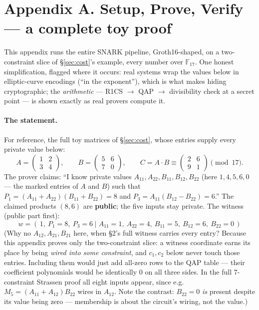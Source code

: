 \documentclass[10pt]{article}
\begin{document}
\section*{Appendix A. Setup, Prove, Verify --- a complete toy
proof}\label{app:tutorial}

This appendix runs the entire SNARK pipeline, Groth16-shaped, on a
two-constraint slice of \S\ref{sec:cost}'s example, every number over
$\mathbb{F}_{17}$. One honest simplification, flagged where it
occurs: real systems wrap the values below in elliptic-curve
encodings (``in the exponent''), which is what makes hiding
cryptographic; the \emph{arithmetic} --- R1CS $\to$ QAP $\to$
divisibility check at a secret point --- is shown exactly as real
provers compute it.

\paragraph{The statement.} For reference, the full toy matrices of
\S\ref{sec:cost}, whose entries supply every private value below:
\[
A = \begin{pmatrix} 1 & 2\\ 3 & 4 \end{pmatrix}, \qquad
B = \begin{pmatrix} 5 & 6\\ 7 & 0 \end{pmatrix}, \qquad
C = A\cdot B \equiv \begin{pmatrix} 2 & 6\\ 9 & 1 \end{pmatrix}
\pmod{17}.
\]
The prover claims: ``I know private values $A_{11}, A_{22}, B_{11},
B_{12}, B_{22}$ (here $1, 4, 5, 6, 0$ --- the marked entries of $A$
and $B$) such that $P_1 = (A_{11}{+}A_{22})(B_{11}{+}B_{22}) = 8$ and
$P_3 = A_{11}(B_{12}{-}B_{22}) = 6$.'' The claimed products $(8,6)$
are \textbf{public}; the five inputs stay private. The witness
(public part first):
\[
w = (\,1,\ P_1{=}8,\ P_3{=}6 \mid A_{11}{=}1,\ A_{22}{=}4,\
      B_{11}{=}5,\ B_{12}{=}6,\ B_{22}{=}0\,)
\]
(Why no $A_{12}, A_{21}, B_{21}$ here, when \S2's full witness
carries every entry?  Because this appendix proves only the
two-constraint slice: a witness coordinate earns its place by being
\emph{wired into some constraint}, and $c_1, c_2$ below never
touch those entries.  Including them would just add all-zero rows
to the QAP table --- their coefficient polynomials would be
identically 0 on all three sides.  In the full 7-constraint
Strassen proof all eight inputs appear, since e.g.\ $M_5 =
(A_{11}+A_{12})B_{22}$ wires in $A_{12}$.  Note the contrast:
$B_{22} = 0$ \emph{is} present despite its value being zero ---
membership is about the circuit's wiring, not the value.)
\end{document}
